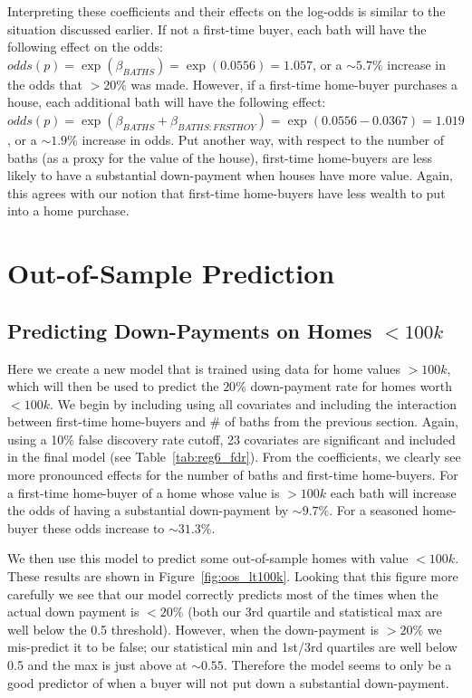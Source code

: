 \documentclass[11pt, fleqn]{article}
\begin{document}

Interpreting these coefficients and their effects on the log-odds is similar to the situation discussed earlier.  If not a first-time buyer, each bath will have the following effect on the odds:  $odds(p)=\exp(\beta_{BATHS})=\exp(0.0556) = 1.057$, or a $\sim5.7\%$ increase in the odds that $>20\%$ was made.  However, if a first-time home-buyer purchases a house, each additional bath will have the following effect: $odds(p)=\exp(\beta_{BATHS}+\beta_{BATHS:FRSTHOY})=\exp(0.0556-0.0367)=1.019$, or a $\sim1.9\%$ increase in odds.  Put another way, with respect to the number of baths (as a proxy for the value of the house), first-time home-buyers are less likely to have a substantial down-payment when houses have more value.  Again, this agrees with our notion that first-time home-buyers have less wealth to put into a home purchase.



\section{Out-of-Sample Prediction}
\subsection{Predicting Down-Payments on Homes $<100k$}
Here we create a new model that is trained using data for home values $>100k$, which will then be used to predict the $20\%$ down-payment rate for homes worth $<100k$.  We begin by including using all covariates and including the interaction between first-time home-buyers and # of baths from the previous section.  Again, using a 10\% false discovery rate cutoff, 23 covariates are significant and included in the final model (see Table~\vref{tab:reg6_fdr}).  From the coefficients, we clearly see more pronounced effects for the number of baths and first-time home-buyers.  For a first-time home-buyer of a home whose value is $>100k$ each bath will increase the odds of having a substantial down-payment by $\sim9.7\%$.  For a seasoned home-buyer these odds increase to $\sim31.3\%$.



We then use this model to predict some out-of-sample homes with value $<100k$.  These results are shown in Figure~\vref{fig:oos_lt100k}.  Looking that this figure more carefully we see that our model correctly predicts most of the times when the actual down payment is $<20\%$ (both our 3rd quartile and statistical max are well below the 0.5 threshold).  However, when the down-payment is $>20\%$ we mis-predict it to be false; our statistical min and 1st/3rd quartiles are well below 0.5 and the max is just above at $\sim0.55$.  Therefore the model seems to only be a good predictor of when a buyer will not put down a substantial down-payment.
\end{document}
